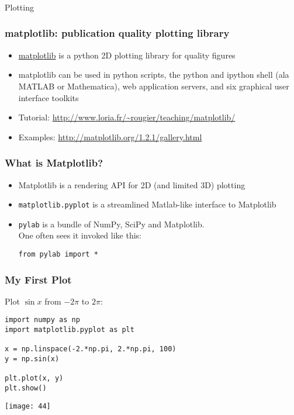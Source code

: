 \begin{frame}[fragile]\frametitle{}
\begin{center}
{\Large Plotting}
\end{center}
\end{frame}

\begin{frame}[fragile]\frametitle{matplotlib: publication quality plotting library}

\begin{itemize}
\item   \href{http://matplotlib.org/}{matplotlib} is a python 2D plotting
  library for quality figures
\item matplotlib can be used in python scripts, the python and
  ipython shell (ala MATLAB or Mathematica), web application
  servers, and six graphical user interface toolkits
    \item Tutorial: {\footnotesize\url{http://www.loria.fr/~rougier/teaching/matplotlib/}}
  \item Examples: {\footnotesize\url{http://matplotlib.org/1.2.1/gallery.html}}
\end{itemize}

\end{frame}

\begin{frame}[fragile]\frametitle{What is Matplotlib?}
    
    \begin{itemize}
        \item Matplotlib is a rendering API for 2D (and limited 3D) plotting
        \item \lstinline|matplotlib.pyplot| is a streamlined Matlab-like interface to Matplotlib
        \item \lstinline|pylab| is a bundle of NumPy, SciPy and Matplotlib.\\
        One often sees it invoked like this:
        \begin{lstlisting}
from pylab import *
        \end{lstlisting}
    \end{itemize}
\end{frame}

\begin{frame}[fragile]
    \frametitle{My First Plot}

    Plot $\sin x$ from $-2\pi$ to $2\pi$:
        \begin{lstlisting}
import numpy as np
import matplotlib.pyplot as plt

x = np.linspace(-2.*np.pi, 2.*np.pi, 100)
y = np.sin(x)

plt.plot(x, y)
plt.show()
        \end{lstlisting}
\begin{center}
\texttt{[image: 44]}
\end{center}
\end{frame}

